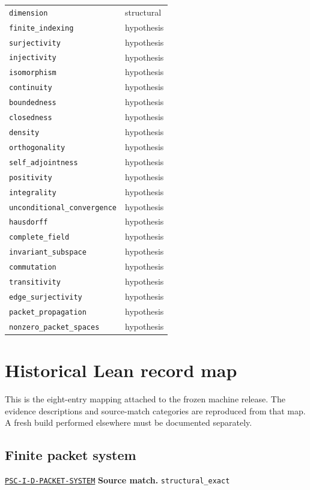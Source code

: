 \documentclass[a4paper,11pt]{article}
\newcommand{\field}[2]{\noindent\textbf{#1.} #2\par}
\begin{document}
\begin{longtable}{@{}p{}p{}@{}}
\nolinkurl{dimension} & structural\\
\nolinkurl{finite_indexing} & hypothesis\\
\nolinkurl{surjectivity} & hypothesis\\
\nolinkurl{injectivity} & hypothesis\\
\nolinkurl{isomorphism} & hypothesis\\
\nolinkurl{continuity} & hypothesis\\
\nolinkurl{boundedness} & hypothesis\\
\nolinkurl{closedness} & hypothesis\\
\nolinkurl{density} & hypothesis\\
\nolinkurl{orthogonality} & hypothesis\\
\nolinkurl{self_adjointness} & hypothesis\\
\nolinkurl{positivity} & hypothesis\\
\nolinkurl{integrality} & hypothesis\\
\nolinkurl{unconditional_convergence} & hypothesis\\
\nolinkurl{hausdorff} & hypothesis\\
\nolinkurl{complete_field} & hypothesis\\
\nolinkurl{invariant_subspace} & hypothesis\\
\nolinkurl{commutation} & hypothesis\\
\nolinkurl{transitivity} & hypothesis\\
\nolinkurl{edge_surjectivity} & hypothesis\\
\nolinkurl{packet_propagation} & hypothesis\\
\nolinkurl{nonzero_packet_spaces} & hypothesis\\
\bottomrule\end{longtable}\clearpage\section{Historical Lean record map}
This is the eight-entry mapping attached to the frozen machine release. The evidence descriptions and source-match categories are reproduced from that map. A fresh build performed elsewhere must be documented separately.
\subsection*{Finite packet system}
\hyperref[rec:PSC-I-D-PACKET-SYSTEM]{\nolinkurl{PSC-I-D-PACKET-SYSTEM}}
\field{Source match}{\nolinkurl{structural_exact}}
\end{document}
